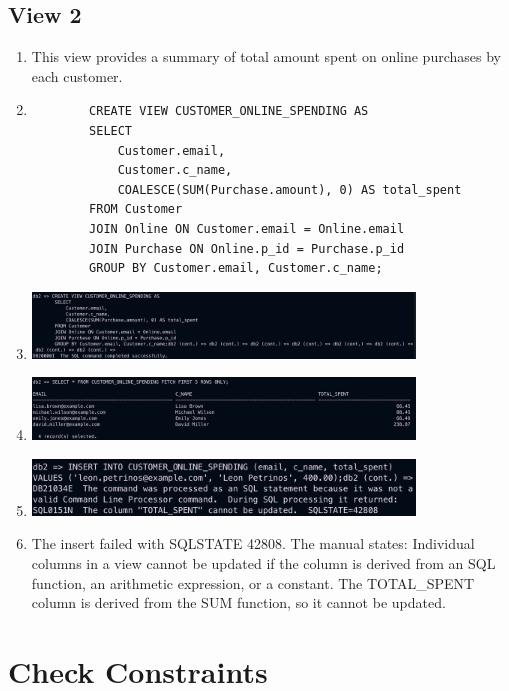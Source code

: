 \documentclass[a4paper,11pt]{article}
\begin{document}
\subsection*{View 2}
\begin{enumerate}[label=(\alph*)]
    \item This view provides a summary of total amount spent on online purchases by each customer.
    \item
    \begin{lstlisting}
        CREATE VIEW CUSTOMER_ONLINE_SPENDING AS
        SELECT
            Customer.email,
            Customer.c_name,
            COALESCE(SUM(Purchase.amount), 0) AS total_spent
        FROM Customer
        JOIN Online ON Customer.email = Online.email
        JOIN Purchase ON Online.p_id = Purchase.p_id
        GROUP BY Customer.email, Customer.c_name;
    \end{lstlisting}
    \item
        \includegraphics[width=0.8\textwidth]{View2.png}
    \item
        \includegraphics[width=0.8\textwidth]{View2_d.png}
    \item
        \includegraphics[width=0.8\textwidth]{View2_e.png}
    \item The insert failed with SQLSTATE 42808. The manual states:
    Individual columns in a view cannot be updated if the column is derived from an SQL function, an arithmetic expression, or a constant.
    The TOTAL\_SPENT column is derived from the SUM function, so it cannot be updated.
\end{enumerate}


\section{Check Constraints}
\end{document}
